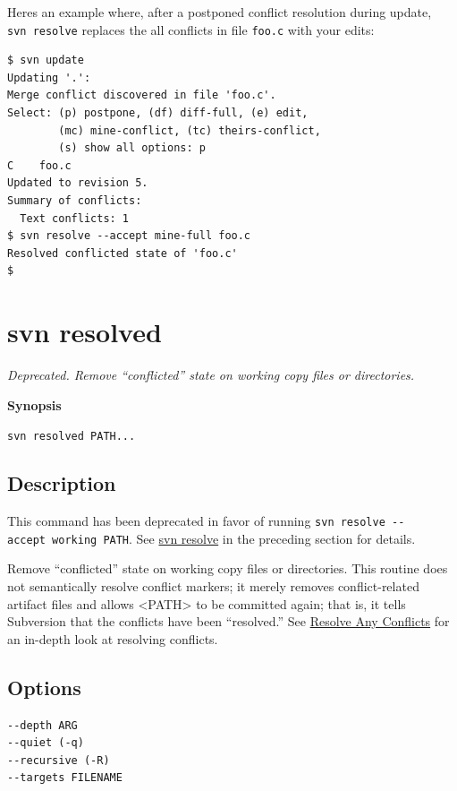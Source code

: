 Here\textquotesingle s an example where, after a postponed conflict
resolution during update, \texttt{svn\ resolve} replaces the all
conflicts in file \texttt{foo.c} with your edits:

\begin{verbatim}
$ svn update
Updating '.':
Merge conflict discovered in file 'foo.c'.
Select: (p) postpone, (df) diff-full, (e) edit,
        (mc) mine-conflict, (tc) theirs-conflict,
        (s) show all options: p
C    foo.c
Updated to revision 5.
Summary of conflicts:
  Text conflicts: 1
$ svn resolve --accept mine-full foo.c
Resolved conflicted state of 'foo.c'
$
\end{verbatim}

\section{svn resolved}\label{svn.ref.svn.c.resolved}

\emph{\emph{Deprecated}. Remove ``conflicted'' state on working copy
files or directories.}

\textbf{Synopsis}

\texttt{svn\ resolved\ PATH...}

\subsection{Description}

This command has been deprecated in favor of running
\texttt{svn\ resolve\ -\/-accept\ working\ PATH}. See
\hyperref[svn.ref.svn.c.resolve]{svn resolve} in the preceding section
for details.

Remove ``conflicted'' state on working copy files or directories. This
routine does not semantically resolve conflict markers; it merely
removes conflict-related artifact files and allows
\textless PATH\textgreater{} to be committed again; that is, it tells
Subversion that the conflicts have been ``resolved.'' See
\hyperref[svn.tour.cycle.resolve]{Resolve Any Conflicts} for an in-depth
look at resolving conflicts.

\subsection{Options}

\begin{verbatim}
--depth ARG
--quiet (-q)
--recursive (-R)
--targets FILENAME
\end{verbatim}

